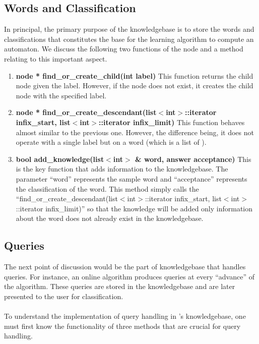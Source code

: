 \subsection{Words and Classification}

	In principal, the primary purpose of the knowledgebase is to store the words and classifications that constitutes the base for the learning algorithm to compute an automaton. We discuss the following two functions of the node and a method relating to this important aspect.
\begin{enumerate}
\item \textbf{node * find\_or\_create\_child(int label)} \hfill \vskip 1pt
	This function returns the child node given the label. However, if the node does not exist, it creates the child node with the specified label.
	
\item \textbf{node * find\_or\_create\_descendant(list$<$int$>$::iterator infix\_start, list$<$int$>$::iterator infix\_limit)} \hfill \vskip 1pt
	This function behaves almost similar to the previous one. However, the difference being, it does not operate with a single label but on a word (which is a list of \integer). 
	
\item \textbf{bool add\_knowledge(list$<$int$>$ \& word, answer acceptance)} \hfill \vskip 1pt
	This is the key function that adds information to the knowledgebase. The parameter ``word'' represents the sample word and ``acceptance'' represents the classification of the word. 
	This method simply calls the ``find\_or\_create\_descendant(list$<$int$>$::iterator infix\_start, list$<$int$>$::iterator infix\_limit)'' so that the knowledge will be added only information about the word does not already exist in the knowledgebase.
\end{enumerate}	

\subsection{Queries}

	The next point of discussion would be the part of knowledgebase that handles queries. For instance, an online algorithm produces queries at every ``advance'' of the algorithm. These queries are stored in the knowledgebase and are later presented to the user for classification.
\paragraph{}
	To understand the implementation of query handling in \libalf's knowledgebase, one must first know the functionality of three methods that are crucial for query handling.

